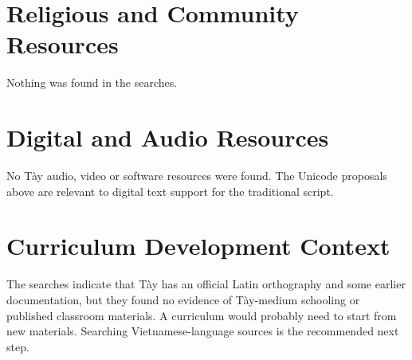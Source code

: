 \documentclass[12pt]{article}
\begin{document}
\section{Religious and Community Resources}
Nothing was found in the searches.

\section{Digital and Audio Resources}
No T\`ay audio, video or software resources were found. The Unicode proposals above are relevant to digital text support for the traditional script.

\section{Curriculum Development Context}
The searches indicate that T\`ay has an official Latin orthography and some earlier documentation, but they found no evidence of T\`ay-medium schooling or published classroom materials. A curriculum would probably need to start from new materials. Searching Vietnamese-language sources is the recommended next step.
\end{document}

